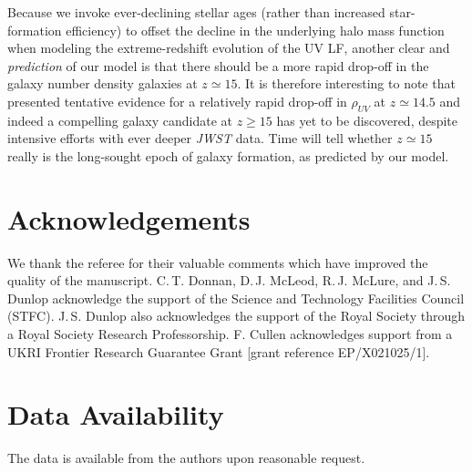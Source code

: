 \documentclass[fleqn,usenatbib]{mnras}
\begin{document}
Because we invoke ever-declining stellar ages (rather than increased star-formation efficiency) to offset the decline in the underlying halo mass function when modeling the extreme-redshift evolution of the UV LF, another clear and {\it prediction} of our model is that there should be a more rapid drop-off in the galaxy number density galaxies at $z \simeq 15$. It is therefore interesting to note that \citet{donnan2024} presented tentative evidence for a relatively rapid drop-off in $\rho_{UV}$ at $z \simeq 14.5$ and indeed a compelling galaxy candidate at $z \ge 15$ has yet to be discovered, despite intensive efforts with ever deeper {\it JWST} data. Time will tell whether $z \simeq 15$ really is the long-sought epoch of galaxy formation, as predicted by our model. 




\section*{Acknowledgements}
We thank the referee for their valuable comments which have improved the quality of the manuscript.
C.\,T. Donnan, D.\,J. McLeod, R.\,J. McLure, and J.\,S. Dunlop acknowledge the support of the Science and Technology Facilities Council (STFC). J.\,S. Dunlop also acknowledges the support of the Royal Society through a Royal Society Research Professorship.
F. Cullen acknowledges support from a UKRI Frontier Research Guarantee Grant [grant reference EP/X021025/1].
\section*{Data Availability}

 
The data is available from the authors upon reasonable request.

















\bsp	%
\label{lastpage}
\end{document}
